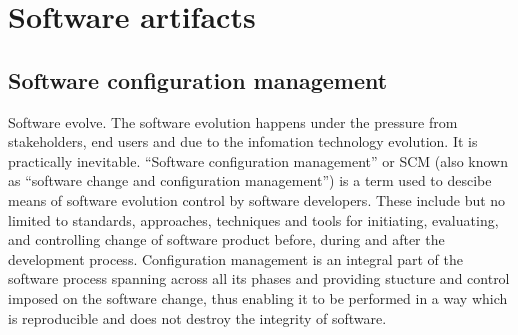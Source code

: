 \chapter{Software artifacts}

\section{Software configuration management}
Software evolve. The software evolution happens under the pressure from stakeholders, end users and due to the infomation technology evolution. It is practically inevitable.
``Software configuration management'' or SCM (also known as ``software change and configuration management'') is a term used to descibe means of software evolution control by
software developers. These include but no limited to standards, approaches, techniques and tools for initiating, evaluating, and controlling change of software product before,
during and after the development process. Configuration management is an integral part of the software process spanning across all its phases and providing stucture and control
imposed on the software change, thus enabling it to be performed in a way which is reproducible and does not destroy the integrity of software.


